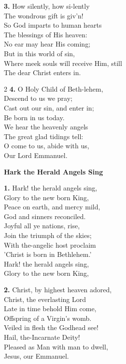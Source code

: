 \documentclass[a5paper,12pt]{article}
\begin{document}
\textbf{3.} How silently, how si-lently\\
The wondrous gift is giv'n!\\
So God imparts to human hearts\\
The blessings of His heaven:\\
No ear may hear His coming;\\
But in this world of sin,\\
Where meek souls will receive Him, still\\
The dear Christ enters in.

\begin{multicols}{2}
\small
\textbf{4.} O Holy Child of Beth-lehem,\\
Descend to us we pray;\\
Cast out our sin, and enter in;\\
Be born in us today.\\
We hear the heavenly angels\\
The great glad tidings tell:\\
O come to us, abide with us,\\
Our Lord Emmanuel.

\end{multicols}
\newpage

\begin{center}{\Large\bfseries Hark the Herald Angels Sing}\end{center}
\vspace{0.3em}
\textbf{1.} Hark! the herald angels sing,\\
Glory to the new born King,\\
Peace on earth, and mercy mild,\\
God and sinners reconciled.\\
Joyful all ye nations, rise,\\
Join the triumph of the skies;\\
With the-angelic host proclaim\\
'Christ is born in Bethlehem.'\\
Hark! the herald angels sing,\\
Glory to the new born King,

\textbf{2.} Christ, by highest heaven adored,\\
Christ, the everlasting Lord\\
Late in time behold Him come,\\
Offspring of a Virgin's womb.\\
Veiled in flesh the Godhead see!\\
Hail, the-Incarnate Deity!\\
Pleased as Man with man to dwell,\\
Jesus, our Emmanuel.
\end{document}
